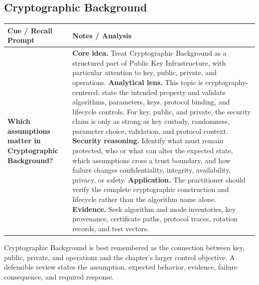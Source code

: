 \documentclass[11pt]{article}
\newcommand{\CornellHeader}{%
\rowcolor{Navy}\color{white}\bfseries Cue / Recall Prompt & \color{white}\bfseries Notes / Analysis\\\hline}
\newcommand{\CornellRow}[2]{%
\cellcolor{CueGray}\RaggedRight\textbf{#1} & \RaggedRight #2\\\hline}
\begin{document}
\subsection*{Cryptographic Background}
\begin{longtable}{>{\RaggedRight\arraybackslash}p{}|>{\RaggedRight\arraybackslash}p{}}
\CornellHeader
\CornellRow{Which assumptions matter in Cryptographic Background?}{\textbf{Core idea.} Treat Cryptographic Background as a structured part of Public Key Infrastructure, with particular attention to key, public, private, and operations. \textbf{Analytical lens.} This topic is cryptography-centered: state the intended property and validate algorithms, parameters, keys, protocol binding, and lifecycle controls. For key, public, and private, the security claim is only as strong as key custody, randomness, parameter choice, validation, and protocol context. \textbf{Security reasoning.} Identify what must remain protected, who or what can alter the expected state, which assumptions cross a trust boundary, and how failure changes confidentiality, integrity, availability, privacy, or safety. \textbf{Application.} The practitioner should verify the complete cryptographic construction and lifecycle rather than the algorithm name alone. \textbf{Evidence.} Seek algorithm and mode inventories, key provenance, certificate paths, protocol traces, rotation records, and test vectors.}
\end{longtable}
\begin{topicsummary}
Cryptographic Background is best remembered as the connection between key, public, private, and operations and the chapter's larger control objective. A defensible review states the assumption, expected behavior, evidence, failure consequence, and required response.
\end{topicsummary}
\end{document}
